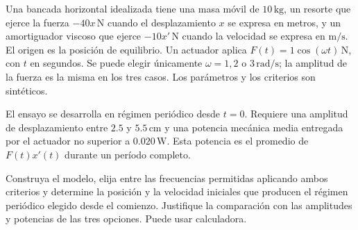 Una bancada horizontal idealizada tiene una masa móvil de \(10\,\mathrm{kg}\), un resorte que ejerce la fuerza \(-40x\,\mathrm N\) cuando el desplazamiento \(x\) se expresa en metros, y un amortiguador viscoso que ejerce \(-10x'\,\mathrm N\) cuando la velocidad se expresa en \(\mathrm{m/s}\). El origen es la posición de equilibrio. Un actuador aplica \(F(t)=1\cos(\omega t)\,\mathrm N\), con \(t\) en segundos. Se puede elegir únicamente \(\omega=1,2\) o \(3\,\mathrm{rad/s}\); la amplitud de la fuerza es la misma en los tres casos. Los parámetros y los criterios son sintéticos.

El ensayo se desarrolla en régimen periódico desde \(t=0\). Requiere una amplitud de desplazamiento entre \(2.5\) y \(5.5\,\mathrm{cm}\) y una potencia mecánica media entregada por el actuador no superior a \(0.020\,\mathrm W\). Esta potencia es el promedio de \(F(t)x'(t)\) durante un período completo.

Construya el modelo, elija entre las frecuencias permitidas aplicando ambos criterios y determine la posición y la velocidad iniciales que producen el régimen periódico elegido desde el comienzo. Justifique la comparación con las amplitudes y potencias de las tres opciones. Puede usar calculadora.
